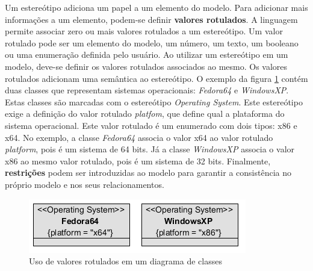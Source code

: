 Um estereótipo adiciona um papel a um elemento do modelo. Para adicionar mais informações a um elemento, podem-se definir \textbf{valores rotulados}.
A linguagem permite associar zero ou mais valores rotulados a um estereótipo. Um valor rotulado pode ser um elemento do modelo, um número, um texto, um booleano ou uma 
enumeração definida pelo usuário. Ao utilizar um estereótipo em um modelo, deve-se definir os valores rotulados associados ao mesmo. Os valores
rotulados adicionam uma semântica ao estereótipo. O exemplo da figura \ref{fig:tagged_values_1} contém duas classes que representam sistemas
operacionais: \textit{Fedora64} e \textit{WindowsXP}. Estas classes são marcadas com o estereótipo \textit{Operating System}. Este estereótipo 
exige a definição do valor rotulado \textit{platfom}, que define qual a plataforma do sistema operacional. Este valor rotulado é um enumerado com dois
tipos: x86 e x64. No exemplo, a classe \textit{Fedora64} associa o valor x64 ao valor rotulado \textit{platform}, pois é um sistema de 64 bits. Já a classe
\textit{WindowsXP} associa o valor x86 ao mesmo valor rotulado, pois é um sistema de 32 bits. Finalmente, \textbf{restrições} podem ser
introduzidas ao modelo para garantir a consistência no próprio modelo e nos seus relacionamentos.

\begin{figure}
	\centering
	\includegraphics{img/tagged_values_1.png}
	\caption{Uso de valores rotulados em um diagrama de classes}\label{fig:tagged_values_1}
\end{figure}

